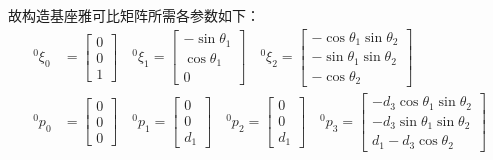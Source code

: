 \documentclass[UTF8, 12pt]{ctexart}
\begin{document}
故构造基座雅可比矩阵所需各参数如下：
\[
\begin{aligned}
    {}^0 \xi_0 &= \begin{bmatrix}
                    0 \\ 0 \\ 1
                \end{bmatrix} \quad
    {}^0 \xi_1 = \begin{bmatrix}
                    -\sin\theta_1 \\ \cos\theta_1 \\ 0
                \end{bmatrix} \quad
    {}^0 \xi_2 = \begin{bmatrix}
                    -\cos\theta_1 \sin\theta_2 \\ -\sin\theta_1 \sin\theta_2 \\ -\cos\theta_2
                \end{bmatrix} \\
    {}^0 p_0 &= \begin{bmatrix}
                    0 \\ 0 \\ 0
                \end{bmatrix} \quad
    {}^0 p_1 = \begin{bmatrix}
                    0 \\ 0 \\ d_1
                \end{bmatrix} \quad
    {}^0 p_2 = \begin{bmatrix}
                    0 \\ 0 \\ d_1
                \end{bmatrix} \quad
    {}^0 p_3 = \begin{bmatrix}
                    -d_3 \cos\theta_1 \sin\theta_2 \\
                    -d_3 \sin\theta_1 \sin\theta_2 \\
                    d_1 - d_3 \cos\theta_2
                \end{bmatrix} \\
\end{aligned}
\]
\end{document}
